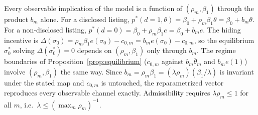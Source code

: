 Every observable implication of the model is a function of $(\rho_m,\beta_1)$ through the
product $b_m$ alone. For a disclosed listing, $p^*(d=1,\theta)=\beta_0+\rho_m\beta_1\theta
=\beta_0+b_m\theta$. For a non-disclosed listing, $p^*(d=0)=\beta_0+\rho_m\beta_1
e=\beta_0+b_m e$. The hiding incentive is $\Delta(\sigma_0)=\rho_m\beta_1 e(\sigma_0)-c_{0,m}
=b_m e(\sigma_0)-c_{0,m}$, so the equilibrium $\sigma_0^*$ solving $\Delta(\sigma_0^*)=0$
depends on $(\rho_m,\beta_1)$ only through $b_m$. The regime boundaries of
Proposition~\ref{prop:equilibrium} ($c_{0,m}$ against $b_m\bar\theta_m$ and $b_m e(1)$) involve
$(\rho_m,\beta_1)$ the same way. Since $b_m=\rho_m\beta_1=(\lambda\rho_m)(\beta_1/\lambda)$ is
invariant under the stated map and $c_{0,m}$ is untouched, the reparametrized vector reproduces
every observable channel exactly. Admissibility requires $\lambda\rho_m\le1$ for all $m$, i.e.\
$\lambda\le(\max_m\rho_m)^{-1}$.
